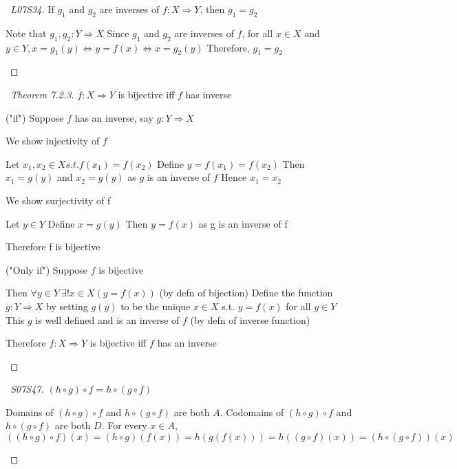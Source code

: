 \documentclass[a4paper]{article}
\theoremstyle{definition}
\begin{document}
\begin{proof}[\proofname\ L07S34] If $g_1$ and $g_2$ are inverses of $f: X \Rightarrow Y$, then $g_1 = g_2$
  \begin{numpf}
    \pfln Note that $g_1, g_2: Y \Rightarrow X$
    \pfln Since $g_1$ and $g_2$ are inverses of $f$, for all $x \in X$ and $y \in Y, x = g_1(y) \Leftrightarrow y = f(x) \Leftrightarrow x = g_2(y)$
    \pfln Therefore, $g_1 = g_2$
  \end{numpf}
\end{proof}

\begin{proof}[\proofname\ Theorem 7.2.3] $f: X \Rightarrow Y$ is bijective iff $f$ has inverse
  \begin{numpf}
    \pfln ("if") Suppose $f$ has an inverse, say $g: Y \Rightarrow X$
    \begin{subpf}
      \pfln We show injectivity of $f$
      \begin{subpf}
        \pfln Let $x_1, x_2 \in X s.t. f(x_1) = f(x_2)$
        \pfln Define $y = f(x_1) = f(x_2)$
        \pfln Then $x_1 = g(y)$ and $x_2 = g(y)$ as $g$ is an inverse of $f$
        \pfln Hence $x_1 = x_2$
      \end{subpf}
      \pfln We show surjectivity of f
      \begin{subpf}
        \pfln Let $y \in Y$
        \pfln Define $x = g(y)$
        \pfln Then $y = f(x)$ as g is an inverse of f
      \end{subpf}
      \pfln Therefore f is bijective
    \end{subpf}
    \pfln ("Only if") Suppose $f$ is bijective
    \begin{subpf}
      \pfln Then $\forall y \in Y\ \exists!x \in X(y = f(x))$ (by defn of bijection)
      \pfln Define the function $g: Y \Rightarrow X$ by setting $g(y)$ to be the unique $x \in X$ s.t. $y = f(x)$ for all $y \in Y$
      \pfln This $g$ is well defined and is an inverse of $f$ (by defn of inverse function)
    \end{subpf}
    \pfln Therefore $f: X \Rightarrow Y$ is bijective iff $f$ has an inverse
  \end{numpf}
\end{proof}

\begin{proof}[\proofname\ S07S47] $(h \circ g) \circ f = h \circ (g \circ f)$
  \begin{numpf}
    \pfln Domains of $(h \circ g) \circ f$ and $h \circ (g \circ f)$ are both $A$.
    \pfln Codomains of $(h \circ g) \circ f$ and $h \circ (g \circ f)$ are both $D$.
    \pfln For every $x \in A$, $((h \circ g) \circ f)(x) = (h \circ g)(f(x)) = h(g(f(x))) = h((g \circ f)(x)) = (h \circ (g \circ f))(x)$
  \end{numpf}

\end{proof}
\end{document}

